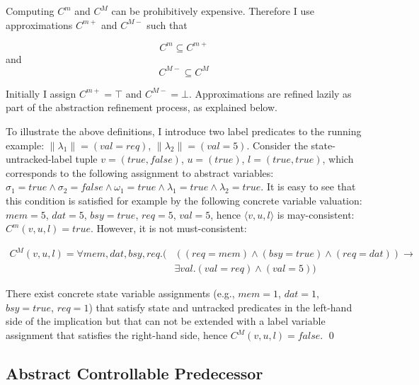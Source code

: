 Computing $C^m$ and $C^M$ can be prohibitively expensive.  Therefore I use approximations $C^{m+}$ and $C^{M-}$ such that 

\begin{equation}
    C^m\subseteq C^{m+}
\end{equation}
and 
\begin{equation}
    C^{M-}\subseteq C^M
\end{equation} 

Initially I assign $C^{m+}=\top$ and $C^{M-}=\bot$.  Approximations are refined lazily as part of the abstraction refinement process, as explained below.

\begin{ex}
    \everymath{\mathtt{\xdef\tmp{\fam\the\fam\relax}\aftergroup\tmp}}
    \everydisplay{\mathtt{\xdef\tmp{\fam\the\fam\relax}\aftergroup\tmp}}
    To illustrate the above definitions, I introduce two label predicates to the running example: $\|\lambda_1\|= (val=req)$, $\|\lambda_2\| = (val=5)$. Consider the state-untracked-label tuple $v=(true,false)$, $u=(true)$, $l=(true, true)$, which corresponds to the following assignment to abstract variables: $\sigma_1=true \land \sigma_2=false \land \omega_1=true \land \lambda_1=true \land\lambda_2=true$. It is easy to see that this condition is satisfied for example by the following concrete variable valuation: $mem=5$, $dat=5$, $bsy=true$, $req=5$, $val=5$, hence $\langle v,u,l\rangle$ is may-consistent: $C^m(v,u,l)=true$.  However, it is not must-consistent:

    $$
    \begin{aligned}
        C^M(v,u,l) = \forall  mem, dat, bsy,req. (&((req=mem) \land (bsy = true) \land (req=dat)) \rightarrow \\
                                                  &\exists val. (val=req) \land (val=5))
    \end{aligned}
    $$
    
    There exist concrete state variable assignments (e.g., $mem=1$, $dat=1$, $bsy=true$, $req=1$) that satisfy state and untracked predicates in the left-hand side of the implication but that can not be extended with a label variable assignment that satisfies the right-hand side, hence $C^M(v,u,l)=false$.  
    \qed
\end{ex}

\subsection{Abstract Controllable Predecessor}

